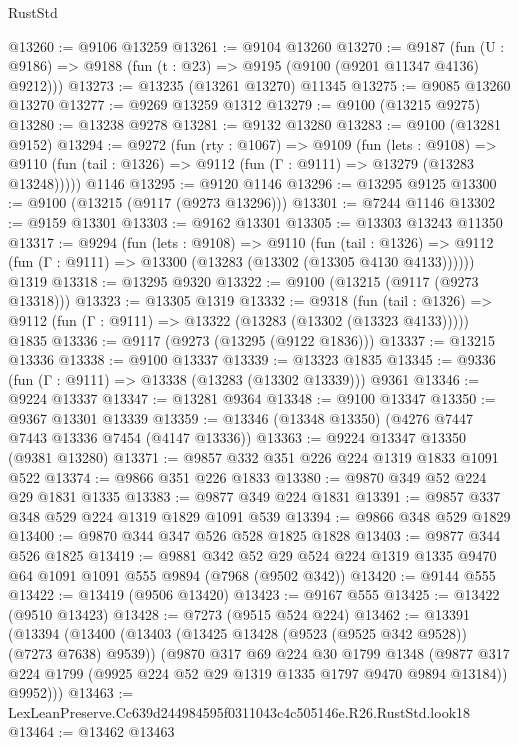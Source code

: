 \begin{lexlean}{RustStd}
\begin{coremodule}
@13260 := @9106 @13259
@13261 := @9104 @13260
@13270 := @9187
    (fun (U : @9186) => @9188 (fun (t : @23) => @9195 (@9100 (@9201 @11347 @4136) @9212)))
@13273 := @13235 (@13261 @13270) @11345
@13275 := @9085 @13260 @13270
@13277 := @9269 @13259 @1312
@13279 := @9100 (@13215 @9275)
@13280 := @13238 @9278
@13281 := @9132 @13280
@13283 := @9100 (@13281 @9152)
@13294 := @9272
    (fun (rty : @1067) =>
    @9109
      (fun (lets : @9108) =>
      @9110 (fun (tail : @1326) => @9112 (fun (Γ : @9111) => @13279 (@13283 @13248)))))
    @1146
@13295 := @9120 @1146
@13296 := @13295 @9125
@13300 := @9100 (@13215 (@9117 (@9273 @13296)))
@13301 := @7244 @1146
@13302 := @9159 @13301
@13303 := @9162 @13301
@13305 := @13303 @13243 @11350
@13317 := @9294
    (fun (lets : @9108) =>
    @9110
      (fun (tail : @1326) =>
      @9112 (fun (Γ : @9111) => @13300 (@13283 (@13302 (@13305 @4130 @4133))))))
    @1319
@13318 := @13295 @9320
@13322 := @9100 (@13215 (@9117 (@9273 @13318)))
@13323 := @13305 @1319
@13332 := @9318
    (fun (tail : @1326) => @9112 (fun (Γ : @9111) => @13322 (@13283 (@13302 (@13323 @4133)))))
    @1835
@13336 := @9117 (@9273 (@13295 (@9122 @1836)))
@13337 := @13215 @13336
@13338 := @9100 @13337
@13339 := @13323 @1835
@13345 := @9336 (fun (Γ : @9111) => @13338 (@13283 (@13302 @13339))) @9361
@13346 := @9224 @13337
@13347 := @13281 @9364
@13348 := @9100 @13347
@13350 := @9367 @13301 @13339
@13359 := @13346 (@13348 @13350) (@4276 @7447 @7443 @13336 @7454 (@4147 @13336))
@13363 := @9224 @13347 @13350 (@9381 @13280)
@13371 := @9857 @332 @351 @226 @224 @1319 @1833 @1091 @522
@13374 := @9866 @351 @226 @1833
@13380 := @9870 @349 @52 @224 @29 @1831 @1335
@13383 := @9877 @349 @224 @1831
@13391 := @9857 @337 @348 @529 @224 @1319 @1829 @1091 @539
@13394 := @9866 @348 @529 @1829
@13400 := @9870 @344 @347 @526 @528 @1825 @1828
@13403 := @9877 @344 @526 @1825
@13419 := @9881
    @342
    @52
    @29
    @524
    @224
    @1319
    @1335
    @9470
    @64
    @1091
    @1091
    @555
    @9894
    (@7968 (@9502 @342))
@13420 := @9144 @555
@13422 := @13419 (@9506 @13420)
@13423 := @9167 @555
@13425 := @13422 (@9510 @13423)
@13428 := @7273 (@9515 @524 @224)
@13462 := @13391
    (@13394
      (@13400
        (@13403 (@13425 @13428 (@9523 (@9525 @342 @9528)) (@7273 @7638) @9539))
        (@9870
          @317
          @69
          @224
          @30
          @1799
          @1348
          (@9877 @317 @224 @1799 (@9925 @224 @52 @29 @1319 @1335 @1797 @9470 @9894 @13184))
          @9952)))
@13463 := LexLeanPreserve.Cc639d244984595f0311043c4c505146e.R26.RustStd.look18
@13464 := @13462 @13463

\end{coremodule}
\end{lexlean}
